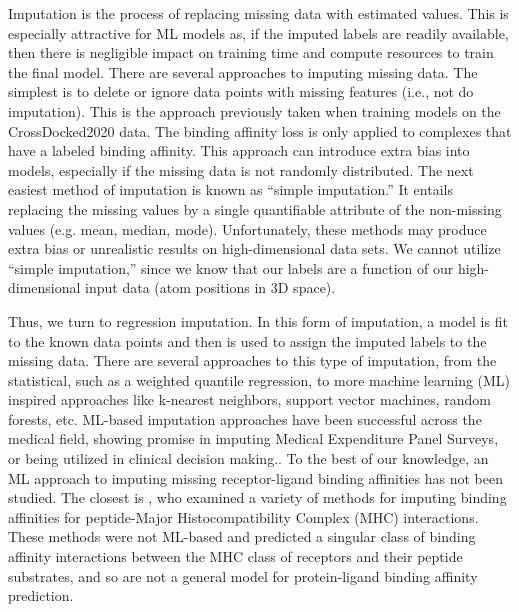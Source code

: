 \documentclass[journal=jcim,manuscript=article]{achemso}
\begin{document}
Imputation is the process of replacing missing data with estimated values.\cite{surveyReview1, review2}
This is especially attractive for ML models as, if the imputed labels are readily available, then there is negligible impact on training time and compute resources to train the final model.
There are several approaches to imputing missing data.
The simplest is to delete or ignore data points with missing features (i.e., not do imputation).
This is the approach previously taken when training models on the CrossDocked2020 data.\cite{crossdocked2020}  
The binding affinity loss is only applied to complexes that have a labeled binding affinity.
This approach can introduce extra bias into models, especially if the missing data is not randomly distributed.\cite{rev1support}
The next easiest method of imputation is known as ``simple imputation.''
It entails replacing the missing values by a single quantifiable attribute of the non-missing values (e.g. mean, median, mode).
Unfortunately, these methods may produce extra bias or unrealistic results on high-dimensional data sets.\cite{SICE}
We cannot utilize ``simple imputation,'' since we know that our labels are a function of our high-dimensional input data (atom positions in 3D space).

Thus, we turn to regression imputation.
In this form of imputation, a model is fit to the known data points and then is used to assign the imputed labels to the missing data.
There are several approaches to this type of imputation, from the statistical, such as a weighted quantile regression, to more machine learning (ML) inspired approaches like k-nearest neighbors, support vector machines, random forests, etc.\cite{rev1support,review2}
ML-based imputation approaches have been successful across the medical field, showing promise in imputing Medical Expenditure Panel Surveys\cite{MLimpMedsurvey}, or being utilized in clinical decision making.\cite{MLclinicDecision}.
To the best of our knowledge, an ML approach to imputing missing receptor-ligand binding affinities has not been studied.
The closest is \citet{peptideMHCimp}, who examined a variety of methods for imputing binding affinities for peptide-Major Histocompatibility Complex (MHC) interactions.
These methods were not ML-based and predicted a singular class of binding affinity interactions between the MHC class of receptors and their peptide substrates,\cite{peptideMHCimp} and so are not a general model for protein-ligand binding affinity prediction.
\end{document}
